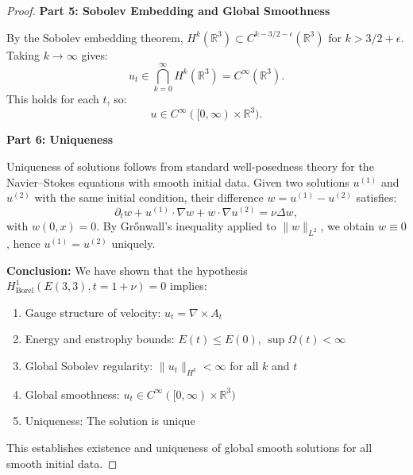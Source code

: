 \documentclass[reqno,10pt]{amsart}
\theoremstyle{plain}
\theoremstyle{definition}
\begin{document}
\begin{proof}
\textbf{Part 5: Sobolev Embedding and Global Smoothness}

By the Sobolev embedding theorem, $H^k(\mathbb{R}^3) \subset C^{k-3/2-\epsilon}(\mathbb{R}^3)$ for $k > 3/2 + \epsilon$. Taking $k\to\infty$ gives:
\[
  u_t \in \bigcap_{k=0}^\infty H^k(\mathbb{R}^3) = C^\infty(\mathbb{R}^3).
\]
This holds for each $t$, so:
\[
  u \in C^\infty([0,\infty)\times\mathbb{R}^3).
\]

\textbf{Part 6: Uniqueness}

Uniqueness of solutions follows from standard well-posedness theory for the Navier--Stokes equations with smooth initial data. Given two solutions $u^{(1)}$ and $u^{(2)}$ with the same initial condition, their difference $w=u^{(1)}-u^{(2)}$ satisfies:
\[
  \partial_t w + u^{(1)}\cdot\nabla w + w\cdot\nabla u^{(2)} = \nu\Delta w,
\]
with $w(0,x)=0$. By Gr\H{o}nwall's inequality applied to $\|w\|_{L^2}$, we obtain $w\equiv 0$, hence $u^{(1)}=u^{(2)}$ uniquely.

\textbf{Conclusion:}
We have shown that the hypothesis $H^1_{\text{Borel}}(E(3,3), t=1+\nu)=0$ implies:
\begin{enumerate}
\item Gauge structure of velocity: $u_t = \nabla\times A_t$
\item Energy and enstrophy bounds: $E(t) \le E(0)$, $\sup \Omega(t)<\infty$
\item Global Sobolev regularity: $\|u_t\|_{H^k} < \infty$ for all $k$ and $t$
\item Global smoothness: $u_t \in C^\infty([0,\infty)\times\mathbb{R}^3)$
\item Uniqueness: The solution is unique
\end{enumerate}
This establishes existence and uniqueness of global smooth solutions for all smooth initial data.
\end{proof}
\end{document}
